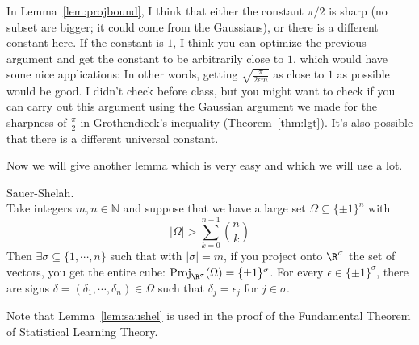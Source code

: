 \begin{rem}
In Lemma~\ref{lem:projbound}, I think that either the constant $\pi/2$ is sharp (no subset are bigger; it could come from the Gaussians), or there is a different constant here. If the constant is $1$, I think you can optimize the previous argument and get the constant to be arbitrarily close to $1$, which would have some nice applications: In other words, getting $\sqrt{\frac{\pi}{2\epsilon m}}$ as close to $1$ as possible would be good. I didn't check before class, but you might want to check if you can carry out this argument using the Gaussian argument we made for the sharpness of $\frac{\pi}{2}$ in Grothendieck's inequality (Theorem~\ref{thm:lgt}). It's also possible that there is a different universal constant. 
\end{rem}

Now we will give another lemma which is very easy and which we will use a lot. 
\begin{lem} Sauer-Shelah.  \\
Take integers $m, n \in \mathbb{N}$ and suppose that we have a large set $\Omega \subseteq \{\pm 1\}^n$ with 
\[
|\Omega| > \sum_{k = 0}^{n - 1} {n \choose k}
\]
Then $\exists \sigma \subseteq \{1, \cdots, n\}$ such that with $|\sigma| = m$, if you project onto $\R^{\sigma}$ the set of vectors, you get the entire cube: $\text{Proj}_{\R^{\sigma}}(\Omega) = \{\pm 1\}^{\sigma}$. For every $\epsilon \in \{\pm 1\}^{\sigma}$, there are signs $\delta = (\delta_1, \cdots, \delta_n) \in \Omega$ such that $\delta_j = \epsilon_j$ for $j \in \sigma$.
\end{lem}

Note that Lemma~\ref{lem:saushel} is used in the proof of the Fundamental Theorem of Statistical Learning Theory. 

